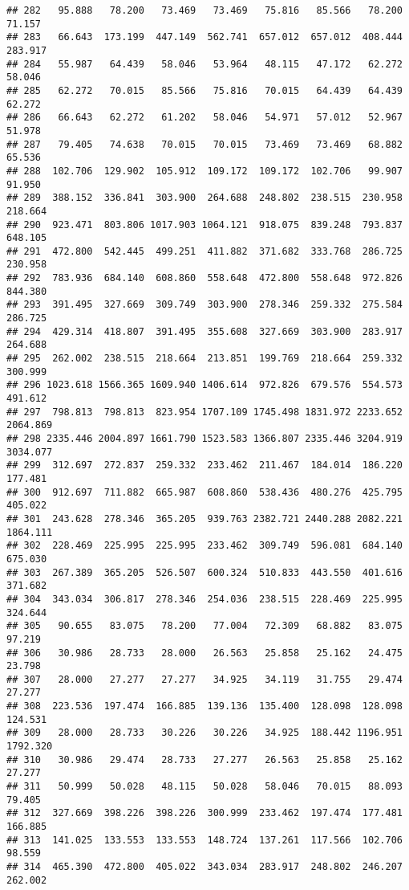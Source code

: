 \documentclass[
]{article}
\begin{document}
\begin{verbatim}
## 282   95.888   78.200   73.469   73.469   75.816   85.566   78.200   71.157
## 283   66.643  173.199  447.149  562.741  657.012  657.012  408.444  283.917
## 284   55.987   64.439   58.046   53.964   48.115   47.172   62.272   58.046
## 285   62.272   70.015   85.566   75.816   70.015   64.439   64.439   62.272
## 286   66.643   62.272   61.202   58.046   54.971   57.012   52.967   51.978
## 287   79.405   74.638   70.015   70.015   73.469   73.469   68.882   65.536
## 288  102.706  129.902  105.912  109.172  109.172  102.706   99.907   91.950
## 289  388.152  336.841  303.900  264.688  248.802  238.515  230.958  218.664
## 290  923.471  803.806 1017.903 1064.121  918.075  839.248  793.837  648.105
## 291  472.800  542.445  499.251  411.882  371.682  333.768  286.725  230.958
## 292  783.936  684.140  608.860  558.648  472.800  558.648  972.826  844.380
## 293  391.495  327.669  309.749  303.900  278.346  259.332  275.584  286.725
## 294  429.314  418.807  391.495  355.608  327.669  303.900  283.917  264.688
## 295  262.002  238.515  218.664  213.851  199.769  218.664  259.332  300.999
## 296 1023.618 1566.365 1609.940 1406.614  972.826  679.576  554.573  491.612
## 297  798.813  798.813  823.954 1707.109 1745.498 1831.972 2233.652 2064.869
## 298 2335.446 2004.897 1661.790 1523.583 1366.807 2335.446 3204.919 3034.077
## 299  312.697  272.837  259.332  233.462  211.467  184.014  186.220  177.481
## 300  912.697  711.882  665.987  608.860  538.436  480.276  425.795  405.022
## 301  243.628  278.346  365.205  939.763 2382.721 2440.288 2082.221 1864.111
## 302  228.469  225.995  225.995  233.462  309.749  596.081  684.140  675.030
## 303  267.389  365.205  526.507  600.324  510.833  443.550  401.616  371.682
## 304  343.034  306.817  278.346  254.036  238.515  228.469  225.995  324.644
## 305   90.655   83.075   78.200   77.004   72.309   68.882   83.075   97.219
## 306   30.986   28.733   28.000   26.563   25.858   25.162   24.475   23.798
## 307   28.000   27.277   27.277   34.925   34.119   31.755   29.474   27.277
## 308  223.536  197.474  166.885  139.136  135.400  128.098  128.098  124.531
## 309   28.000   28.733   30.226   30.226   34.925  188.442 1196.951 1792.320
## 310   30.986   29.474   28.733   27.277   26.563   25.858   25.162   27.277
## 311   50.999   50.028   48.115   50.028   58.046   70.015   88.093   79.405
## 312  327.669  398.226  398.226  300.999  233.462  197.474  177.481  166.885
## 313  141.025  133.553  133.553  148.724  137.261  117.566  102.706   98.559
## 314  465.390  472.800  405.022  343.034  283.917  248.802  246.207  262.002

\end{verbatim}
\end{document}
